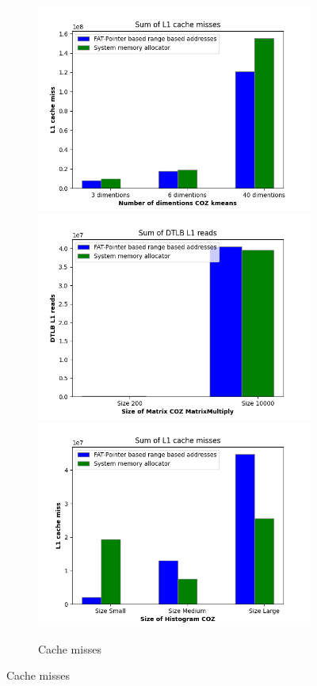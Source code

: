 \begin{figure}
  \begin{subfigure}{\linewidth}
    \includegraphics[width=.5\linewidth]{l1-miss-kmeans.png}\hfill
    \includegraphics[width=.5\linewidth]{l1-miss-matrixmultiply.png}\hfill
    \includegraphics[width=.5\linewidth]{l1-miss-histogram.png}
  \caption{Cache misses}
\end{subfigure}
\end{figure}